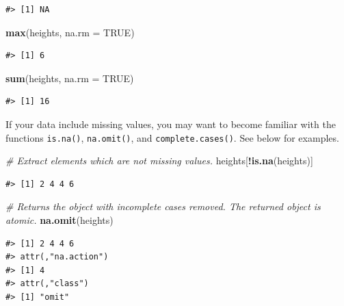 \documentclass[
]{book}
\newenvironment{Shaded}{\begin{snugshade}}{\end{snugshade}}
\newcommand{\CommentTok}[1]{\textcolor[rgb]{0.56,0.35,0.01}{\textit{#1}}}
\newcommand{\DataTypeTok}[1]{\textcolor[rgb]{0.13,0.29,0.53}{#1}}
\newcommand{\KeywordTok}[1]{\textcolor[rgb]{0.13,0.29,0.53}{\textbf{#1}}}
\newcommand{\NormalTok}[1]{#1}
\newcommand{\OperatorTok}[1]{\textcolor[rgb]{0.81,0.36,0.00}{\textbf{#1}}}
\newcommand{\OtherTok}[1]{\textcolor[rgb]{0.56,0.35,0.01}{#1}}
\begin{document}
\begin{verbatim}
#> [1] NA
\end{verbatim}

\begin{Shaded}
\begin{Highlighting}[]
\KeywordTok{max}\NormalTok{(heights, }\DataTypeTok{na.rm =} \OtherTok{TRUE}\NormalTok{)}
\end{Highlighting}
\end{Shaded}

\begin{verbatim}
#> [1] 6
\end{verbatim}

\begin{Shaded}
\begin{Highlighting}[]
\KeywordTok{sum}\NormalTok{(heights, }\DataTypeTok{na.rm =} \OtherTok{TRUE}\NormalTok{)}
\end{Highlighting}
\end{Shaded}

\begin{verbatim}
#> [1] 16
\end{verbatim}

If your data include missing values, you may want to become familiar with the
functions \texttt{is.na()}, \texttt{na.omit()}, and \texttt{complete.cases()}. See below for
examples.

\begin{Shaded}
\begin{Highlighting}[]
\CommentTok{# Extract elements which are not missing values.}
\NormalTok{heights[}\OperatorTok{!}\KeywordTok{is.na}\NormalTok{(heights)]}
\end{Highlighting}
\end{Shaded}

\begin{verbatim}
#> [1] 2 4 4 6
\end{verbatim}

\begin{Shaded}
\begin{Highlighting}[]
\CommentTok{# Returns the object with incomplete cases removed. The returned object is atomic.}
\KeywordTok{na.omit}\NormalTok{(heights)}
\end{Highlighting}
\end{Shaded}

\begin{verbatim}
#> [1] 2 4 4 6
#> attr(,"na.action")
#> [1] 4
#> attr(,"class")
#> [1] "omit"
\end{verbatim}
\end{document}
